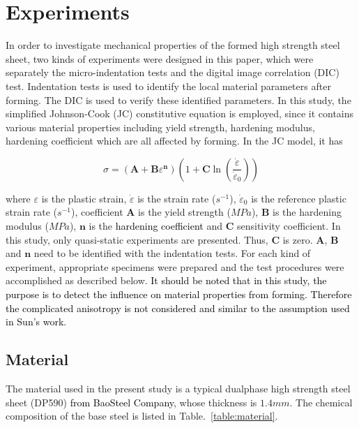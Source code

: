 \documentclass[review]{elsarticle}
\begin{document}
\section{Experiments}
In order to investigate mechanical properties of the formed high strength steel sheet, two kinds of experiments were designed in this paper, which were separately the micro-indentation tests and the digital image correlation (DIC) test. Indentation tests is used to identify the local material parameters after forming. The DIC is used to verify these identified parameters. In this study, the simplified Johnson-Cook (JC) constitutive equation \cite{rule1998revised} is employed, since it contains various material properties including yield strength, hardening modulus, hardening coefficient which are all affected by forming. In the JC model, it has

\begin{equation}
\label{eq:JC}
\sigma=\left( \mathbf{A} + \mathbf{B} \varepsilon ^ \mathbf{n} \right) \left( 1 + \mathbf{C} \ln \left(\frac{\dot{\varepsilon}}{\dot{\varepsilon}_0} \right) \right)
\end{equation}

\noindent where $\varepsilon$ is the plastic strain, $\dot{\varepsilon}$ is the strain rate ($s^{-1}$), 
$\dot{\varepsilon}_0$ is the reference plastic strain rate ($s^{-1}$), coefficient $\mathbf{A}$ is the yield strength ($MPa$), $\mathbf{B}$ is the hardening modulus ($MPa$), $\mathbf{n}$ is the \textcolor{black}{hardening coefficient} and $\mathbf{C}$ sensitivity coefficient. In this study, only quasi-static experiments are presented. Thus, $\mathbf{C}$ is zero. $\mathbf{A}$, $\mathbf{B}$ and $\mathbf{n}$ need to be identified with the indentation tests. For each kind of experiment, appropriate specimens were prepared and the test procedures were accomplished as described below. \textcolor{black}{It should be noted that in this study, the purpose is to detect the influence on material properties from forming. Therefore the complicated anisotropy is not considered and similar to the assumption used in Sun's\cite{sun2014determination} work.} 

\subsection{Material}
The material used in the present study is a typical dualphase high strength steel sheet (DP590) \textcolor{black}{from BaoSteel Company}, whose thickness is $1.4mm$. The chemical composition of the base steel is listed in Table.~\ref{table:material}.
\end{document}
